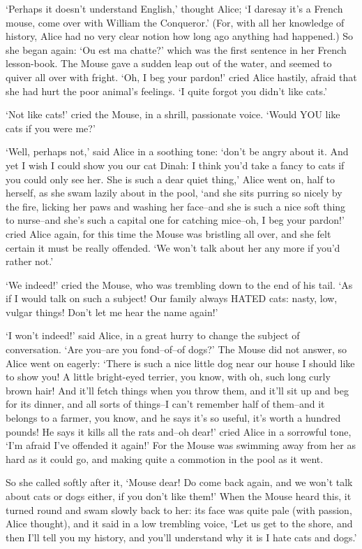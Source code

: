 \documentclass[12pt]{book}
\begin{document}
  `Perhaps it doesn't understand English,' thought Alice; `I
daresay it's a French mouse, come over with William the
Conqueror.'  (For, with all her knowledge of history, Alice had
no very clear notion how long ago anything had happened.)  So she
began again:  `Ou est ma chatte?' which was the first sentence in
her French lesson-book.  The Mouse gave a sudden leap out of the
water, and seemed to quiver all over with fright.  `Oh, I beg
your pardon!' cried Alice hastily, afraid that she had hurt the
poor animal's feelings.  `I quite forgot you didn't like cats.'

  `Not like cats!' cried the Mouse, in a shrill, passionate
voice.  `Would YOU like cats if you were me?'

  `Well, perhaps not,' said Alice in a soothing tone:  `don't be
angry about it.  And yet I wish I could show you our cat Dinah:
I think you'd take a fancy to cats if you could only see her.
She is such a dear quiet thing,' Alice went on, half to herself,
as she swam lazily about in the pool, `and she sits purring so
nicely by the fire, licking her paws and washing her face--and
she is such a nice soft thing to nurse--and she's such a capital
one for catching mice--oh, I beg your pardon!' cried Alice again,
for this time the Mouse was bristling all over, and she felt
certain it must be really offended.  `We won't talk about her any
more if you'd rather not.'

  `We indeed!' cried the Mouse, who was trembling down to the end
of his tail.  `As if I would talk on such a subject!  Our family
always HATED cats:  nasty, low, vulgar things!  Don't let me hear
the name again!'

  `I won't indeed!' said Alice, in a great hurry to change the
subject of conversation.  `Are you--are you fond--of--of dogs?'
The Mouse did not answer, so Alice went on eagerly:  `There is
such a nice little dog near our house I should like to show you!
A little bright-eyed terrier, you know, with oh, such long curly
brown hair!  And it'll fetch things when you throw them, and
it'll sit up and beg for its dinner, and all sorts of things--I
can't remember half of them--and it belongs to a farmer, you
know, and he says it's so useful, it's worth a hundred pounds!
He says it kills all the rats and--oh dear!' cried Alice in a
sorrowful tone, `I'm afraid I've offended it again!'  For the
Mouse was swimming away from her as hard as it could go, and
making quite a commotion in the pool as it went.

  So she called softly after it, `Mouse dear!  Do come back
again, and we won't talk about cats or dogs either, if you don't
like them!'  When the Mouse heard this, it turned round and swam
slowly back to her:  its face was quite pale (with passion, Alice
thought), and it said in a low trembling voice, `Let us get to
the shore, and then I'll tell you my history, and you'll
understand why it is I hate cats and dogs.'
\end{document}
